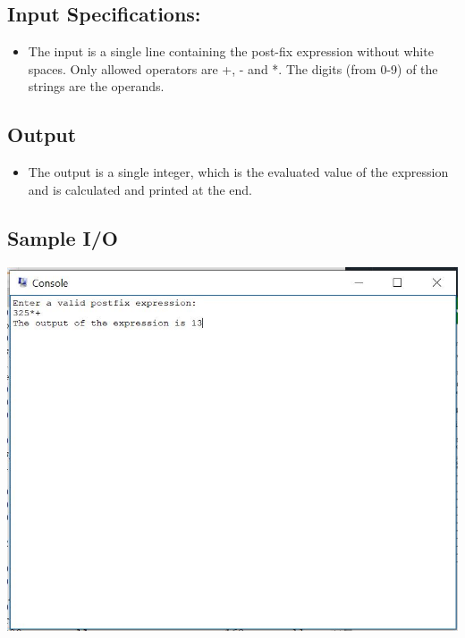 \documentclass{article} %
\begin{document}
\subsection{Input Specifications:}
\begin{itemize}
    \item The input is a single line containing the post-fix expression without white spaces. Only allowed operators are +, - and *. The digits (from 0-9) of the strings are the operands.
\end{itemize}
\subsection{Output}
\begin{itemize}
    \item The output is a single integer, which is the evaluated value of the expression and is calculated and printed at the end.
\end{itemize}
\subsection{Sample I/O}
    \includegraphics{sampleio_A2.JPG}
\end{document}
